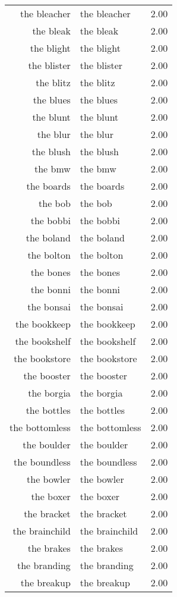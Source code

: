 \begin{table}[ht]
\begin{tabular}{rlr}
  the bleacher & the bleacher & 2.00 \\ 
  the bleak & the bleak & 2.00 \\ 
  the blight & the blight & 2.00 \\ 
  the blister & the blister & 2.00 \\ 
  the blitz & the blitz & 2.00 \\ 
  the blues & the blues & 2.00 \\ 
  the blunt & the blunt & 2.00 \\ 
  the blur & the blur & 2.00 \\ 
  the blush & the blush & 2.00 \\ 
  the bmw & the bmw & 2.00 \\ 
  the boards & the boards & 2.00 \\ 
  the bob & the bob & 2.00 \\ 
  the bobbi & the bobbi & 2.00 \\ 
  the boland & the boland & 2.00 \\ 
  the bolton & the bolton & 2.00 \\ 
  the bones & the bones & 2.00 \\ 
  the bonni & the bonni & 2.00 \\ 
  the bonsai & the bonsai & 2.00 \\ 
  the bookkeep & the bookkeep & 2.00 \\ 
  the bookshelf & the bookshelf & 2.00 \\ 
  the bookstore & the bookstore & 2.00 \\ 
  the booster & the booster & 2.00 \\ 
  the borgia & the borgia & 2.00 \\ 
  the bottles & the bottles & 2.00 \\ 
  the bottomless & the bottomless & 2.00 \\ 
  the boulder & the boulder & 2.00 \\ 
  the boundless & the boundless & 2.00 \\ 
  the bowler & the bowler & 2.00 \\ 
  the boxer & the boxer & 2.00 \\ 
  the bracket & the bracket & 2.00 \\ 
  the brainchild & the brainchild & 2.00 \\ 
  the brakes & the brakes & 2.00 \\ 
  the branding & the branding & 2.00 \\ 
  the breakup & the breakup & 2.00 \\ 

\end{tabular}
\end{table}

